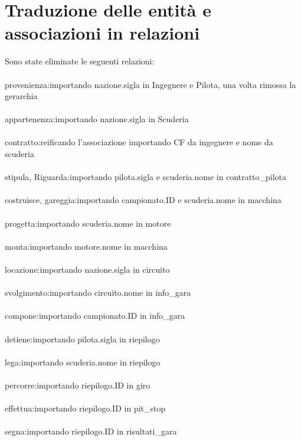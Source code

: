 \documentclass[a4paper,12pt]{report}
\begin{document}
	\section{Traduzione delle entità e associazioni in relazioni}
	Sono state eliminate le seguenti relazioni:\\\\
	provenienza:\tab 			importando nazione.sigla in Ingegnere 
	\tab\tab\tab					e Pilota, una volta rimossa la gerarchia\\\\
	appartenenza:\tab 			importando nazione.sigla in Scuderia\\\\
	contratto:\tab 				reificando l'associazione importando CF 
	\tab\tab\tab				da ingegnere e nome da scuderia\\\\
	stipula, Riguarda:\tab 		importando pilota.sigla e scuderia.nome 
	\tab\tab\tab				in contratto\_pilota\\\\
	costruisce, gareggia:\tab 	importando campionato.ID e scuderia.nome 
	\tab\tab\tab				in macchina\\\\
	progetta:\tab 				importando scuderia.nome in motore\\\\
	monta:\tab 					importando motore.nome in macchina\\\\
	locazione:\tab 				importando nazione.sigla in circuito\\\\
	svolgimento:\tab 			importando circuito.nome in info\_gara\\\\
	compone:\tab 				importando campionato.ID in info\_gara\\\\
	detiene:\tab 				importando pilota.sigla in riepilogo\\\\
	lega:\tab					importando scuderia.nome in riepilogo\\\\
	percorre:\tab				importando riepilogo.ID in giro\\\\
	effettua:\tab				importando riepilogo.ID in pit\_stop\\\\
	segna:\tab					importando riepilogo.ID in risultati\_gara\\\\
\end{document}
